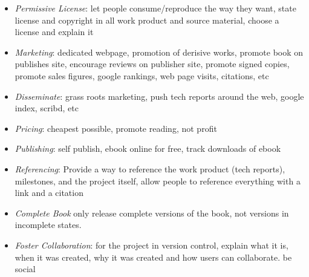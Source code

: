 \documentclass[a4paper, 11pt]{article}
\begin{document}
\begin{itemize}
	\item \emph{Permissive License}: let people consume/reproduce the way they want, state license and copyright in all work product and source material, choose a license and explain it
	\item \emph{Marketing}: dedicated webpage, promotion of derisive works, promote book on publishes site, encourage reviews on publisher site, promote signed copies, promote sales figures, google rankings, web page visits, citations, etc
	\item \emph{Disseminate}: grass roots marketing, push tech reports around the web, google index, scribd, etc
	\item \emph{Pricing}: cheapest possible, promote reading, not profit
	\item \emph{Publishing}: self publish, ebook online for free, track downloads of ebook 
	\item \emph{Referencing}: Provide a way to reference the work product (tech reports), milestones, and the project itself, allow people to reference everything with a link and a citation
	\item \emph{Complete Book} only release complete versions of the book, not versions in incomplete states.
	\item \emph{Foster Collaboration}: for the project in version control, explain what it is, when it was created, why it was created and how users can collaborate. be social
\end{itemize}




\end{document}
